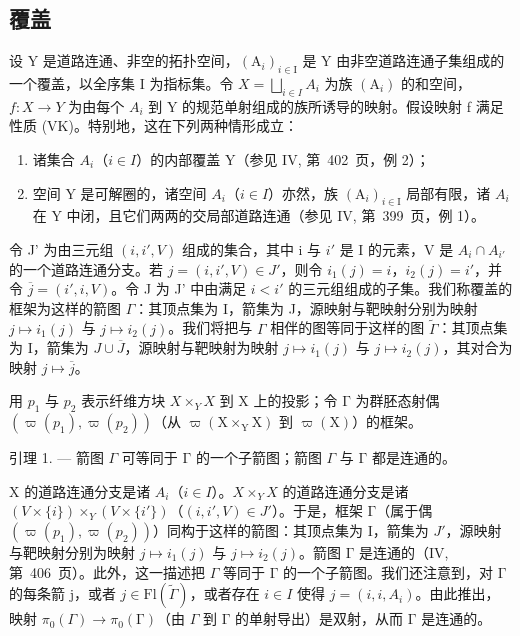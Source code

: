 \subsection{覆盖}

设 Y 是道路连通、非空的拓扑空间，\((\mathrm{A}_{i})_{i\in\mathrm{I}}\) 是 Y 由非空道路连通子集组成的一个覆盖，以全序集 I 为指标集。令 \(X=\bigsqcup_{i\in I}A_{i}\) 为族 \((\mathrm{A}_{i})\) 的和空间，\(f:X\to Y\) 为由每个 \(A_{i}\) 到 Y 的规范单射组成的族所诱导的映射。假设映射 f 满足性质 (VK)。特别地，这在下列两种情形成立：

\begin{enumerate}
\def\labelenumi{(\roman{enumi})}
\item
  诸集合 \(A_{i}\)（\(i \in I\)）的内部覆盖 Y（参见 IV, 第~402~页，例 2）；
\item
  空间 Y 是可解圈的，诸空间 \(A_{i}\)（\(i \in I\)）亦然，族 \((\mathrm{A}_{i})_{i \in \mathrm{I}}\) 局部有限，诸 \(A_{i}\) 在 Y 中闭，且它们两两的交局部道路连通（参见 IV, 第~399~页，例 1）。
\end{enumerate}

令 J' 为由三元组 \((i, i', V)\) 组成的集合，其中 i 与 \(i'\) 是 I 的元素，V 是 \(A_i \cap A_{i'}\) 的一个道路连通分支。若 \(j = (i, i', V) \in J'\)，则令 \(i_1(j) = i\)，\(i_2(j) = i'\)，并令 \(\overline{j} = (i', i, V)\)。令 J 为 J' 中由满足 \(i < i'\) 的三元组组成的子集。我们称覆盖的框架为这样的箭图 \(\Gamma\)：其顶点集为 I，箭集为 J，源映射与靶映射分别为映射 \(j \mapsto i_1(j)\) 与 \(j \mapsto i_2(j)\)。我们将把与 \(\Gamma\) 相伴的图等同于这样的图 \(\widetilde{\Gamma}\)：其顶点集为 I，箭集为 \(J \cup \overline{J}\)，源映射与靶映射为映射 \(j \mapsto i_{1}(j)\) 与 \(j \mapsto i_{2}(j)\)，其对合为映射 \(j \mapsto \overline{j}\)。

用 \(p_1\) 与 \(p_2\) 表示纤维方块 \(X \times_{Y} X\) 到 X 上的投影；令 \(\textsf{Γ}\) 为群胚态射偶 \((\varpi(p_1), \varpi(p_2))\)（从 \(\varpi(\mathrm{X} \times_{\mathrm{Y}} \mathrm{X})\) 到 \(\varpi(\mathrm{X})\)）的框架。

引理 1. --- 箭图 \(\Gamma\) 可等同于 \(\textsf{Γ}\) 的一个子箭图；箭图 \(\Gamma\) 与 \(\textsf{Γ}\) 都是连通的。

X 的道路连通分支是诸 \(A_{i}\)（\(i \in I\)）。\(X \times_{Y} X\) 的道路连通分支是诸 \((V \times \{i\}) \times_{Y} (V \times \{i'\})\)（\((i, i', V) \in J'\)）。于是，框架 \(\textsf{Γ}\)（属于偶 \((\varpi(p_1), \varpi(p_2))\)）同构于这样的箭图：其顶点集为 I，箭集为 \(J'\)，源映射与靶映射分别为映射 \(j \mapsto i_1(j)\) 与 \(j \mapsto i_2(j)\)。箭图 \(\textsf{Γ}\) 是连通的（IV, 第~406~页）。此外，这一描述把 \(\Gamma\) 等同于 \(\textsf{Γ}\) 的一个子箭图。我们还注意到，对 \(\textsf{Γ}\) 的每条箭 j，或者 \(j \in \mathrm{Fl}(\widetilde{\Gamma})\)，或者存在 \(i \in I\) 使得 \(j = (i, i, A_i)\)。由此推出，映射 \(\pi_0(\Gamma) \to \pi_0(\textsf{Γ})\)（由 \(\Gamma\) 到 \(\textsf{Γ}\) 的单射导出）是双射，从而 \(\textsf{Γ}\) 是连通的。

